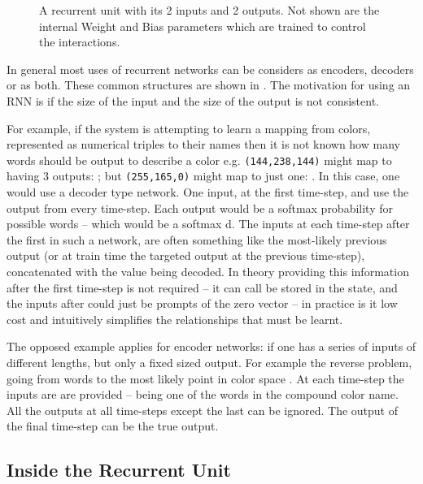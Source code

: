 \documentclass[12pt,parskip]{komatufte}
\begin{document}
\begin{figure}
	\caption{A recurrent unit with its 2 inputs and 2 outputs. Not shown are the internal Weight and Bias parameters which are trained to control the interactions.}	
	
	\label{fig-ru}
	
	
\end{figure}

In general most uses of recurrent networks can be considers as encoders, decoders or as both.
These common structures are shown in .
The motivation for using an RNN is if the size of the input and the size of the output is not consistent.

For example, if the system is attempting to learn a mapping from colors, represented as numerical triples to their names then it is not known how many words should be output to describe a color e.g. \texttt{(144,238,144)} might map to having 3 outputs: ; but \texttt{(255,165,0)} might map to just one:  .
In this case, one would use a decoder type network.
One input, at the first time-step, and use the output from every time-step.
Each output would be a softmax probability for possible words -- which would be a softmax d.
The inputs at each time-step after the first in such a network, are often something like the most-likely previous output (or at train time the targeted output at the previous time-step), concatenated with the value being decoded.
In theory providing this information after the first time-step is not required -- it can call be stored in the state, and the inputs after could just be prompts of the zero vector -- in practice is it low cost and intuitively simplifies the relationships that must be learnt.

The opposed example applies for encoder networks:
if one has a series of inputs of different lengths,
but only a fixed sized output.
For example the reverse problem, going from words to the most likely point in color space .
At each time-step the inputs are are provided -- being one of the words in the compound color name.
All the outputs at all time-steps except the last can be ignored.
The output of the final time-step can be the true output.






\subsection{Inside the Recurrent Unit}
\end{document}

